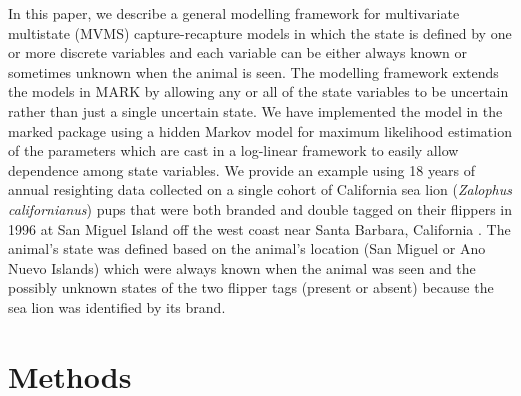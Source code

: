\documentclass[sts]{imsart}
\numberwithin{equation}{section}
\theoremstyle{plain}
\begin{document}
In this paper, we describe a general modelling framework for multivariate multistate (MVMS) capture-recapture models in which the state is defined by one or more discrete variables and each variable can be either always known or sometimes unknown when the animal is seen. The modelling framework extends the models in MARK by allowing any or all of the state variables to be uncertain rather than just a single uncertain state. We have implemented the model in the marked package \citep{Laake2013MEE} using a hidden Markov model for maximum likelihood estimation of the parameters which are cast in a log-linear framework \citep{Cormack1989,darroch1980note} to easily allow dependence among state variables. We provide an example using 18 years of annual resighting data collected on a single cohort of California sea lion ({\it Zalophus californianus}) pups that were both branded and double tagged on their flippers in 1996 at San Miguel Island off the west coast near Santa Barbara, California \citep{Melin2011}. The animal's state was defined based on the animal's location (San Miguel or Ano Nuevo Islands) which were always known when the animal was seen and the possibly unknown states of the two flipper tags (present or absent) because the sea lion was identified by its brand.

\section{Methods}
\end{document}
